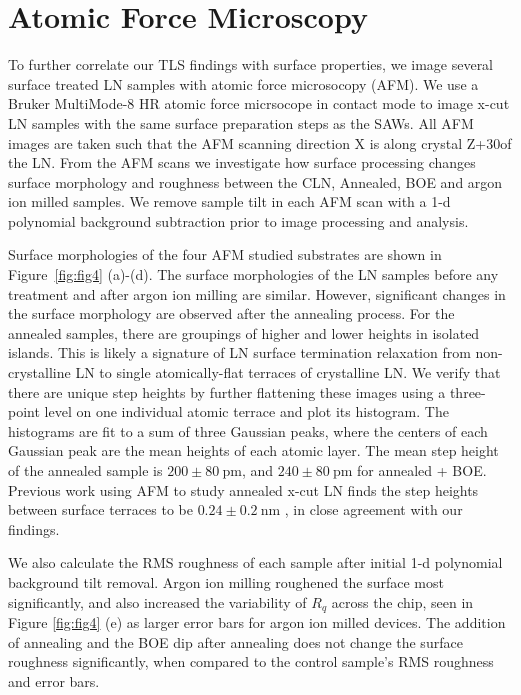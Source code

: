 \documentclass[
 prapplied,
 amsmath,amssymb,
 reprint, longbibliography, superscriptaddress
]{revtex4-2}
\begin{document}
\section{Atomic Force Microscopy}
To further correlate our TLS findings with surface properties, we image several surface treated LN samples with atomic force microsocopy (AFM). We use a Bruker MultiMode-8 HR atomic force micrsocope in contact mode to image x-cut LN samples with the same surface preparation steps as the SAWs. All AFM images are taken such that the AFM scanning direction X is along crystal Z+30\degree of the LN. From the AFM scans we investigate how surface processing changes surface morphology and roughness between the CLN, Annealed, BOE and argon ion milled samples. We remove sample tilt in each AFM scan with a 1-d polynomial background subtraction prior to image processing and analysis.

Surface morphologies of the four AFM studied substrates are shown in Figure~\ref{fig:fig4} (a)-(d).  The surface morphologies of the LN samples before any treatment and after argon ion milling are similar. However, significant changes in the surface morphology are observed after the annealing process. For the annealed samples, there are groupings of higher and lower heights in isolated islands. This is likely a signature of LN surface termination relaxation from non-crystalline LN to single atomically-flat terraces of crystalline LN. We verify that there are unique step heights by further flattening these images using a three-point level on one individual atomic terrace and plot its histogram. The histograms are fit to a sum of three Gaussian peaks, where the centers of each Gaussian peak are the mean heights of each atomic layer. The mean step height of the annealed sample is $200 \pm 80~\text{pm}$, and $240 \pm 80~\text{pm}$ for annealed + BOE. Previous work using AFM to study annealed x-cut LN finds the step heights between surface terraces to be $0.24 \pm 0.2~\text{nm}$ \cite{sanna2014unraveling}, in close agreement with our findings. 

We also calculate the RMS roughness of each sample after initial 1-d polynomial background tilt removal. Argon ion milling roughened the surface most significantly, and also increased the variability of $R_q$ across the chip, seen in Figure \ref{fig:fig4} (e) as larger error bars for argon ion milled devices. The addition of annealing and the BOE dip after annealing does not change the surface roughness significantly, when compared to the control sample's RMS roughness and error bars. 
\end{document}
